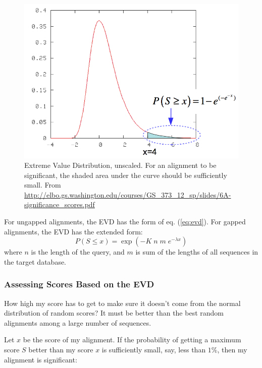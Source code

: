 \begin{figure}[!htb]
\centerline{\includegraphics[width=.6\linewidth]{figs/evd-unscaled.png}}
\caption{Extreme Value Distribution, unscaled. For an alignment to be significant, the shaded area under the curve should be sufficiently small.
From \url{http://elbo.gs.washington.edu/courses/GS\_373\_12\_sp/slides/6A-significance\_scores.pdf}}
\label{fig:evd-unscaled}
\end{figure}

For ungapped alignments, the EVD has the form of 
eq. (\ref{eq:evd}). For gapped alignments, the EVD has the extended form:
\begin{equation}
P(S \le x) = \exp(- K \; n \; m \; e^{- \lambda x} )
\label{eq:evdgap}
\end{equation}
where $n$ is the length of the query, and $m$ is sum of the lengths of all sequences in the target database.



\subsubsection{Assessing Scores Based on the EVD}

How high my score has to get to make sure it doesn't come from the normal distribution of random scores? It must be better than the best random alignments among a large number of sequences.


Let $x$ be the score of my alignment. If the probability of getting a maximum score $S$ better than my score $x$ is sufficiently small, say, less than $1 \%$, then my alignment is significant:

